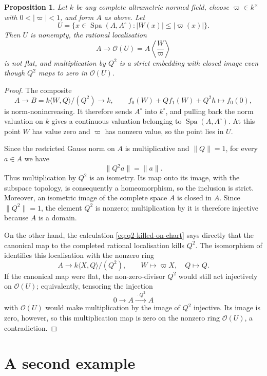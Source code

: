 \documentclass[11pt,reqno]{amsart}
\newtheorem{proposition}[proposition]{Proposition}
\theoremstyle{definition}
\newcommand{\Spa}{\operatorname{Spa}}
\begin{document}
\begin{proposition}\label{prop:problems-24-28}
Let $k$ be any complete ultrametric normed field, choose
$\varpi\in k^\times$ with $0<|\varpi|<1$, and form $A$ as above.  Let
\[
  U=\{x\in\Spa(A,A^\circ):|W(x)|\leq|\varpi(x)|\}.
\]
Then $U$ is nonempty, the rational localisation
\[
  A\longrightarrow \mathcal O(U)
    =A\left\langle\frac{W}{\varpi}\right\rangle
\]
is not flat, and multiplication by $Q^2$ is a strict embedding with closed
image even though $Q^2$ maps to zero in $\mathcal O(U)$.
\end{proposition}

\begin{proof}
The composite
\[
  A\longrightarrow B=k\langle W,Q\rangle/(Q^2)
    \longrightarrow k,
  \qquad
  f_0(W)+Qf_1(W)+Q^2h\longmapsto f_0(0),
\]
is norm-nonincreasing.  It therefore sends $A^\circ$ into $k^\circ$, and
pulling back the norm valuation on $k$ gives a continuous valuation belonging
to $\Spa(A,A^\circ)$.  At this point $W$ has value zero and $\varpi$ has
nonzero value, so the point lies in $U$.

Since the restricted Gauss norm on $A$ is multiplicative and
$\lVert Q\rVert=1$, for every $a\in A$ we have
\[
  \lVert Q^2a\rVert=\lVert a\rVert.
\]
Thus multiplication by $Q^2$ is an isometry.  Its map onto its image, with the
subspace topology, is consequently a homeomorphism, so the inclusion is
strict.  Moreover, an isometric image of the complete space $A$ is closed in
$A$.  Since $\lVert Q^2\rVert=1$, the element $Q^2$ is nonzero; multiplication
by it is therefore injective because $A$ is a domain.

On the other hand, the calculation \eqref{eq:q2-killed-on-chart} says directly
that the canonical map to the completed rational localisation kills $Q^2$.
The isomorphism of  identifies this localisation with the
nonzero ring
\[
  A\longrightarrow k\langle X,Q\rangle/(Q^2),
  \qquad W\longmapsto\varpi X,\quad Q\longmapsto Q.
\]
If the canonical map were flat, the non-zero-divisor $Q^2$ would still act
injectively on $\mathcal O(U)$; equivalently, tensoring the injection
\[
  0\longrightarrow A\xrightarrow{\,\cdot Q^2\,}A
\]
with $\mathcal O(U)$ would make multiplication by the image of $Q^2$
injective.  Its image is zero, however, so this multiplication map is zero on
the nonzero ring $\mathcal O(U)$, a contradiction.
\end{proof}

\section{A second example}\label{sec:second-example}
\end{document}
